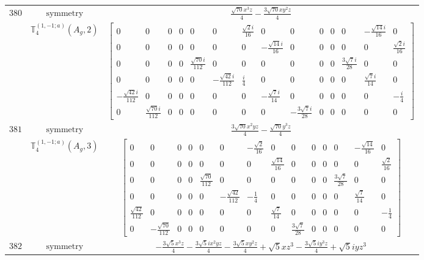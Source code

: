 \documentclass[fleqn,8pt,landscape]{jsarticle}
\begin{document}
\begin{longtable}{ccc}
$ 380 $ & $ \text{symmetry} $ & $ \frac{\sqrt{70} x^{3} z}{4} - \frac{3 \sqrt{70} x y^{2} z}{4} $ \\
$  $ & $ \mathbb{T}_{4}^{(1,-1;a)}(A_{g},2) $ & $ \begin{bmatrix} 0 & 0 & 0 & 0 & 0 & 0 & \frac{\sqrt{2} i}{16} & 0 & 0 & 0 & 0 & 0 & - \frac{\sqrt{14} i}{16} & 0 \\ 0 & 0 & 0 & 0 & 0 & 0 & 0 & - \frac{\sqrt{14} i}{16} & 0 & 0 & 0 & 0 & 0 & \frac{\sqrt{2} i}{16} \\ 0 & 0 & 0 & 0 & \frac{\sqrt{70} i}{112} & 0 & 0 & 0 & 0 & 0 & 0 & \frac{3 \sqrt{7} i}{28} & 0 & 0 \\ 0 & 0 & 0 & 0 & 0 & - \frac{\sqrt{42} i}{112} & \frac{i}{4} & 0 & 0 & 0 & 0 & 0 & \frac{\sqrt{7} i}{14} & 0 \\ - \frac{\sqrt{42} i}{112} & 0 & 0 & 0 & 0 & 0 & 0 & - \frac{\sqrt{7} i}{14} & 0 & 0 & 0 & 0 & 0 & - \frac{i}{4} \\ 0 & \frac{\sqrt{70} i}{112} & 0 & 0 & 0 & 0 & 0 & 0 & - \frac{3 \sqrt{7} i}{28} & 0 & 0 & 0 & 0 & 0 \end{bmatrix} $ \\ \hline
$ 381 $ & $ \text{symmetry} $ & $ \frac{3 \sqrt{70} x^{2} y z}{4} - \frac{\sqrt{70} y^{3} z}{4} $ \\
$  $ & $ \mathbb{T}_{4}^{(1,-1;a)}(A_{g},3) $ & $ \begin{bmatrix} 0 & 0 & 0 & 0 & 0 & 0 & - \frac{\sqrt{2}}{16} & 0 & 0 & 0 & 0 & 0 & - \frac{\sqrt{14}}{16} & 0 \\ 0 & 0 & 0 & 0 & 0 & 0 & 0 & \frac{\sqrt{14}}{16} & 0 & 0 & 0 & 0 & 0 & \frac{\sqrt{2}}{16} \\ 0 & 0 & 0 & 0 & \frac{\sqrt{70}}{112} & 0 & 0 & 0 & 0 & 0 & 0 & \frac{3 \sqrt{7}}{28} & 0 & 0 \\ 0 & 0 & 0 & 0 & 0 & - \frac{\sqrt{42}}{112} & - \frac{1}{4} & 0 & 0 & 0 & 0 & 0 & \frac{\sqrt{7}}{14} & 0 \\ \frac{\sqrt{42}}{112} & 0 & 0 & 0 & 0 & 0 & 0 & \frac{\sqrt{7}}{14} & 0 & 0 & 0 & 0 & 0 & - \frac{1}{4} \\ 0 & - \frac{\sqrt{70}}{112} & 0 & 0 & 0 & 0 & 0 & 0 & \frac{3 \sqrt{7}}{28} & 0 & 0 & 0 & 0 & 0 \end{bmatrix} $ \\ \hline
$ 382 $ & $ \text{symmetry} $ & $ - \frac{3 \sqrt{5} x^{3} z}{4} - \frac{3 \sqrt{5} i x^{2} y z}{4} - \frac{3 \sqrt{5} x y^{2} z}{4} + \sqrt{5} x z^{3} - \frac{3 \sqrt{5} i y^{3} z}{4} + \sqrt{5} i y z^{3} $ \\

\end{longtable}
\end{document}
